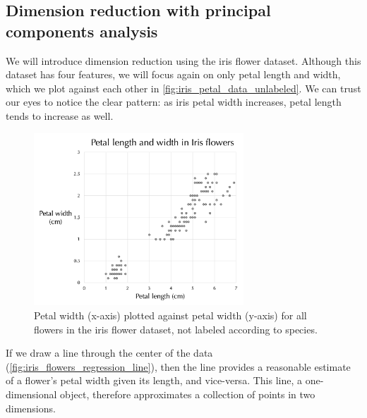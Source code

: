 \FloatBarrier
{}
\subsection{Dimension reduction with principal components analysis}

We will introduce dimension reduction using the iris flower dataset. Although this dataset has four features, we will focus again on only petal length and width, which we plot against each other in \autoref{fig:iris_petal_data_unlabeled}. We can trust our eyes to notice the clear pattern: as iris petal width increases, petal length tends to increase as well.\\

\begin{figure}[h]
\centering
\mySfFamily
\includegraphics[width = 0.7\textwidth]{../images/iris_petal_data_unlabeled.png}
\caption{Petal width (x-axis) plotted against petal width (y-axis) for all flowers in the iris flower dataset, not labeled according to species.}
\label{fig:iris_petal_data_unlabeled}
\end{figure}

If we draw a line through the center of the data (\autoref{fig:iris_flowers_regression_line}), then the line provides a reasonable estimate of a flower's petal width given its length, and vice-versa. This line, a one-dimensional object, therefore approximates a collection of points in two dimensions.\\

